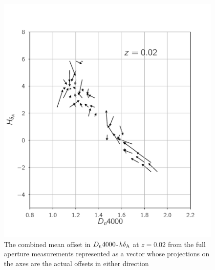 \begin{figure}
\includegraphics[width=\textwidth]{figures/quiver_a.pdf}
\caption[ The combined mean offset in $D_{\rm n}4000$-$h\delta_{\rm A}$ at $z=0.02$ from the full aperture measurements represented as a vector whose projections on the axes are the actual offsets in either direction ]{ The combined mean offset in $D_{\rm n}4000$-$h\delta_{\rm A}$ at $z=0.02$ from the full aperture measurements represented as a vector whose projections on the axes are the actual offsets in either direction
\label{fig:offset_quiver1}}
\end{figure}


